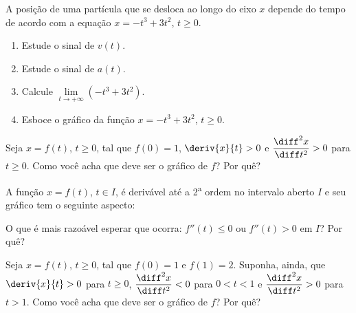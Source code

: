 \begin{exercicio}[3]
\label{ex:7.15.3}
A posição de uma partícula que se desloca ao longo do eixo $x$ depende do tempo de acordo com a equação $x = -t^3 + 3t^2$, $t \ge 0$.
\begin{enumerate}[label=\alph*)]
    \item Estude o sinal de $v(t)$.
    \item Estude o sinal de $a(t)$.
    \item Calcule $\lim\limits_{t \to +\infty} (-t^3 + 3t^2)$.
    \item Esboce o gráfico da função $x = -t^3 + 3t^2$, $t \ge 0$.
\end{enumerate}
\end{exercicio}

\begin{exercicio}[4]
\label{ex:7.15.4}
Seja $x = f(t)$, $t \ge 0$, tal que $f(0) = 1$, $\deriv{x}{t} > 0$ e $\dfrac{\diff^2 x}{\diff t^2} > 0$ para $t \ge 0$. Como você acha que deve ser o gráfico de $f$? Por quê?
\end{exercicio}

\begin{exercicio}[5]
\label{ex:7.15.5}
A função $x = f(t)$, $t \in I$, é derivável até a 2\textsuperscript{a} ordem no intervalo aberto $I$ e seu gráfico tem o seguinte aspecto:

\begin{center}
\end{center}

O que é mais razoável esperar que ocorra: $f''(t) \le 0$ ou $f''(t) > 0$ em $I$? Por quê?
\end{exercicio}

\begin{exercicio}[6]
\label{ex:7.15.6}
Seja $x = f(t)$, $t \ge 0$, tal que $f(0) = 1$ e $f(1) = 2$. Suponha, ainda, que $\deriv{x}{t} > 0$ para $t \ge 0$, $\dfrac{\diff^2x}{\diff t^2} < 0$ para $0 < t < 1$ e $\dfrac{\diff^2x}{\diff t^2} > 0$ para $t > 1$. Como você acha que deve ser o gráfico de $f$? Por quê?
\end{exercicio}

